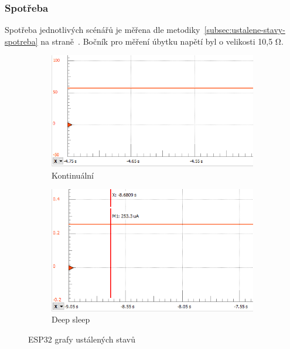 \documentclass[a4paper, 12pt]{report}
\begin{document}
    \subsubsection{Spotřeba}
    Spotřeba jednotlivých scénářů je měřena dle metodiky~\ref{subsec:ustalene-stavy-spotreba} na straně~\pageref{subsec:ustalene-stavy-spotreba}. Bočník pro měření úbytku napětí byl o velikosti 10,5 \si{\ohm}.\\
    \begin{figure}[h]
        \centering
        \begin{subfigure}[b]{0.4\linewidth}
            \includegraphics[width=\linewidth]{images/ESP32_on_waiting}
            \caption{Kontinuální}
        \end{subfigure}
        \begin{subfigure}[b]{0.4\linewidth}
            \includegraphics[width=\linewidth]{images/ESP32_deepsleep_waiting}
            \caption{Deep sleep}
        \end{subfigure}
        \caption{ESP32 grafy ustálených stavů}
        \label{fig:esp32-waiting}
    \end{figure}
\end{document}
